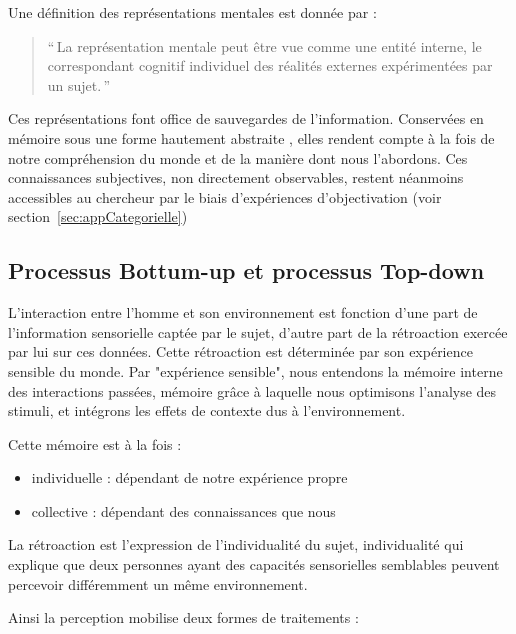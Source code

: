 Une définition des représentations mentales est donnée par \citep{houde1998vocabulaire}:

\begin{quote}
``\,La représentation mentale peut être vue comme une entité interne, le correspondant cognitif individuel des réalités externes expérimentées par un sujet.\,''
\end{quote}

Ces représentations font office de sauvegardes de l'information. Conservées en mémoire sous une forme hautement abstraite \citep[p. ??]{mcadams1994penser}, elles rendent compte à la fois de notre compréhension du monde et de la manière dont nous l'abordons. Ces connaissances subjectives, non directement observables, restent néanmoins accessibles au chercheur par le biais d'expériences d'objectivation (voir section~\ref{sec:appCategorielle})

\subsection{Processus Bottum-up et processus Top-down}

L'interaction entre l'homme et son environnement est fonction d'une part de l'information sensorielle captée par le sujet, d'autre part de la rétroaction exercée par lui sur ces données. Cette rétroaction est déterminée par son expérience sensible du monde. Par "expérience sensible", nous entendons la mémoire interne des interactions passées, mémoire grâce à laquelle nous optimisons l'analyse des stimuli, et intégrons les effets de contexte dus à l'environnement.

Cette mémoire est à la fois :

\begin{itemize}
\item individuelle : dépendant de notre expérience propre
\item collective : dépendant des connaissances que nous 
\end{itemize}

La rétroaction est l'expression de l'individualité du sujet, individualité qui explique que deux personnes ayant des capacités sensorielles semblables peuvent percevoir différemment un même environnement.

Ainsi la perception mobilise deux formes de traitements :

